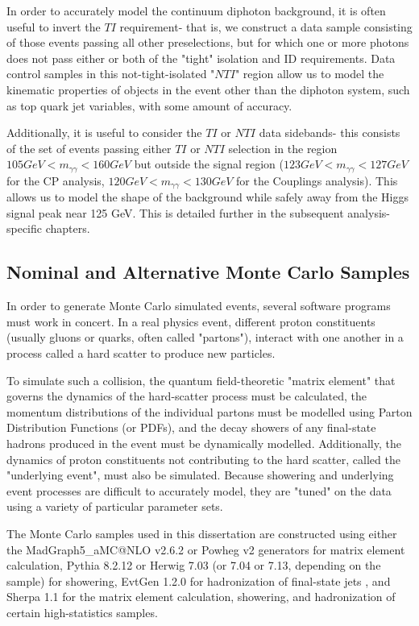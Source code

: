 In order to accurately model the continuum diphoton background, it is often useful to invert the $TI$ requirement- that is, we construct a data sample consisting of those events passing all other preselections, but for which one or more photons does not pass either or both of the "tight" isolation and ID requirements. Data control samples in this not-tight-isolated "$NTI$" region allow us to model the kinematic properties of objects in the event other than the diphoton system, such as top quark jet variables, with some amount of accuracy.

Additionally, it is useful to consider the $TI$ or $NTI$ data sidebands- this consists of the set of events passing either $TI$ or $NTI$ selection in the region $105 GeV < m_{\gamma\gamma} < 160 GeV$ but outside the signal region ($123 GeV < m_{\gamma\gamma} < 127 GeV$ for the CP analysis, $120 GeV < m_{\gamma\gamma} < 130 GeV$ for the Couplings analysis). This allows us to model the shape of the background while safely away from the Higgs signal peak near 125 GeV. This is detailed further in the subsequent analysis-specific chapters.

\subsection{Nominal and Alternative Monte Carlo Samples} \label{sec:NominalMC} 

In order to generate Monte Carlo simulated events, several software programs must work in concert. In a real physics event, different proton constituents (usually gluons or quarks, often called "partons"), interact with one another in a process called a hard scatter to produce new particles. 

To simulate such a collision, the quantum field-theoretic "matrix element" that governs the dynamics of the hard-scatter process must be calculated, the momentum distributions of the individual partons must be modelled using Parton Distribution Functions (or PDFs), and the decay showers of any final-state hadrons produced in the event must be dynamically modelled. Additionally, the dynamics of proton constituents not contributing to the hard scatter, called the "underlying event", must also be simulated. Because showering and underlying event processes are difficult to accurately model, they are "tuned" on the data using a variety of particular parameter sets. 

The Monte Carlo samples used in this dissertation are constructed using either the MadGraph5\_aMC@NLO v2.6.2 \cite{MG5} or Powheg v2 \cite{Powheg} \cite{PowhegBox} generators for matrix element calculation, Pythia 8.2.12 \cite{Pythia8.1} \cite{Pythia8.2} or Herwig 7.03 (or 7.04 or 7.13, depending on the sample) \cite{Herwig} \cite{Herwig7} \cite{Herwig7.1} for showering, EvtGen 1.2.0 for hadronization of final-state jets \cite{EvGen}, and Sherpa 1.1 \cite{Sherpa1} \cite{Sherpa2} \cite{Comix} for the matrix element calculation, showering, and hadronization of certain high-statistics samples.

